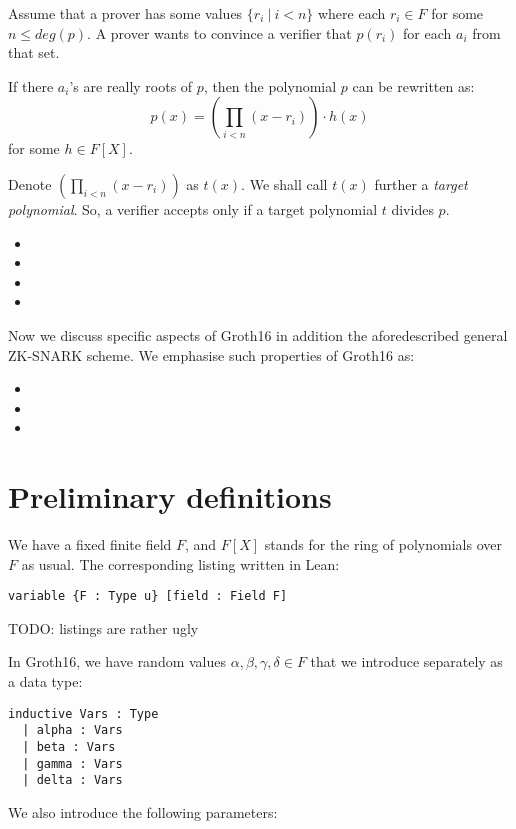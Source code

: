 \documentclass{article}
\theoremstyle{definition}
\theoremstyle{remark}
\begin{document}
Assume that a prover has some values $\{ r_i \: | \: i < n\}$ where each $r_i \in F$ for some $n \leq deg(p)$. A prover wants to convince a verifier that $p(r_i)$ for each $a_i$ from that set.

If there $a_i$'s are really roots of $p$, then the polynomial $p$ can be rewritten as:
\begin{equation}
p(x) = (\prod_{i < n} (x - r_i)) \cdot h(x)
\end{equation}
for some $h \in F[X]$.

Denote $(\prod_{i < n} (x - r_i))$ as $t(x)$. We shall call $t(x)$ further a \emph{target polynomial}. So, a verifier accepts only if a target polynomial $t$ divides $p$.


\begin{itemize}
\item
\item
\item
\item
\end{itemize}

Now we discuss specific aspects of Groth16 in addition the aforedescribed general ZK-SNARK scheme.
We emphasise such properties of Groth16 as:
\begin{itemize}
\item
\item
\item
\end{itemize}

\section{Preliminary definitions}

We have a fixed finite field $F$, and $F[X]$ stands for the ring of polynomials over $F$ as usual. The corresponding listing written in Lean:

\begin{lstlisting}
variable {F : Type u} [field : Field F]
\end{lstlisting}
TODO: listings are rather ugly


In Groth16, we have random values $\alpha, \beta, \gamma, \delta \in F$ that we introduce separately as a data type:
\begin{lstlisting}
inductive Vars : Type
  | alpha : Vars
  | beta : Vars
  | gamma : Vars
  | delta : Vars
\end{lstlisting}

We also introduce the following parameters:
\end{document}

